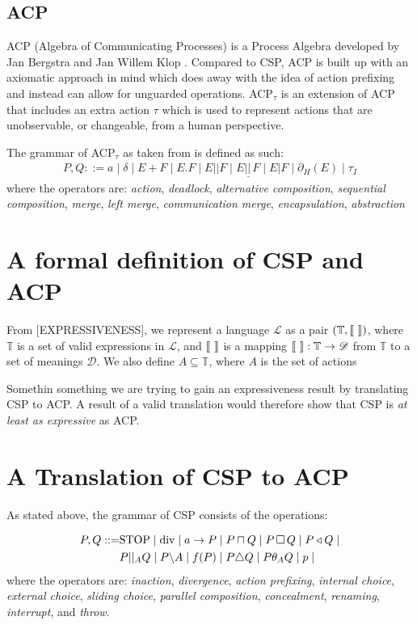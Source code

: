 \documentclass[logo,bsc,singlespacing,parskip,online]{infthesis}
\begin{document}
\section{ACP}
ACP (Algebra of Communicating Processes) is a Process Algebra developed by Jan Bergstra and Jan Willem Klop \citep{bergstraProcessAlgebraSynchronous1984}. Compared to CSP, ACP is built up with an axiomatic approach in mind which does away with the idea of action prefixing and instead can allow for unguarded operations. ACP$_{\tau}$ \citep{bergstraACPtUniversalAxiom1989} is an extension of ACP that includes an extra action $\tau$ which is used to represent actions that are unobservable, or changeable, from a human perspective.

The grammar of ACP$_{\tau}$ as taken from \citep{bergstraACPtUniversalAxiom1989} is defined as such:
\begin{align*}
   P, Q ::= a \mid \delta \mid E + F \mid E . F \mid E | | F \mid E \underline{| | \,} F \mid E | F \mid \partial_{H}(E) \mid \tau_{I}
\end{align*}
where the operators are: \textit{action}, \textit{deadlock}, \textit{alternative composition}, \textit{sequential composition}, \textit{merge}, \textit{left merge}, \textit{communication merge}, \textit{encapsulation}, \textit{abstraction}

\chapter{A formal definition of CSP and ACP}

From [EXPRESSIVENESS], we represent a language $\mathscr{L}$ as a pair $(\mathbb{T}, \llbracket \,\, \rrbracket)$, where $\mathbb{T}$ is a set of valid expressions in $\mathscr{L}$, and $\llbracket \,\, \rrbracket$ is a mapping $\llbracket \,\, \rrbracket : \mathbb{T} \to \mathscr{D}$ from $\mathbb{T}$ to a set of meanings $\mathscr{D}$. We also define $A \subseteq \mathbb{T}$, where $A$ is the set of actions


Somethin something we are trying to gain an expressiveness result by translating CSP to ACP. A result of a valid translation would therefore show that CSP is \textit{at least as expressive} as ACP.

\chapter{A Translation of CSP to ACP}

As stated above, the grammar of CSP consists of the operations:

\begin{align*}
   P, Q ::= &\mathrm{STOP} \mid \mathrm{div} \mid a\to P \mid P \sqcap Q \mid P \,\square\, Q \mid P \triangleleft Q \mid \\
	&P | |_{A} Q \mid P \backslash A \mid f(P) \mid P \triangle Q \mid P \theta_{A} Q \mid p \mid 
\end{align*}
where the operators are: \textit{inaction}, \textit{divergence}, \textit{action prefixing}, \textit{internal choice}, \textit{external choice}, \textit{sliding choice}, \textit{parallel composition}, \textit{concealment}, \textit{renaming}, \textit{interrupt}, and \textit{throw}.
\end{document}
